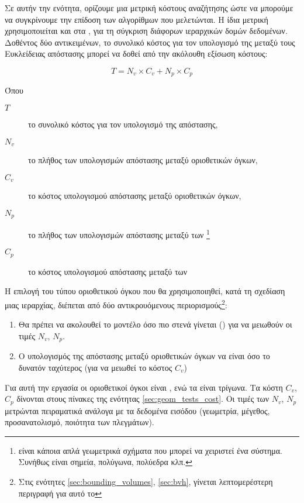 Σε αυτήν την ενότητα, ορίζουμε μια μετρική κόστους αναζήτησης
ώστε να μπορούμε να συγκρίνουμε την επίδοση των αλγορίθμων που μελετώνται.
Η ίδια μετρική χρησιμοποιείται και στα \cite{gottschalk1996obbtree},
\cite{larsen1999fast} για τη σύγκριση διάφορων ιεραρχικών δομών δεδομένων.
Δοθέντος δύο αντικειμένων, το συνολικό κόστος για τον υπολογισμό της μεταξύ τους 
Ευκλείδειας απόστασης μπορεί να δοθεί από την ακόλουθη εξίσωση κόστους:

\[ T = N_v \times C_v + N_p \times C_p \]

Όπου 
\begin{description}
    \item[$T$] το συνολικό κόστος για τον υπολογισμό της απόστασης,
    \item[$N_v$] το πλήθος των υπολογισμών απόστασης μεταξύ οριοθετικών όγκων,
    \item[$C_v$] το κόστος υπολογισμού απόστασης μεταξύ οριοθετικών όγκων,
    \item[$N_p$] το πλήθος των υπολογισμών απόστασης μεταξύ των 
    \footnote{ είναι κάποια απλά γεωμετρικά σχήματα 
    που μπορεί να χειριστεί ένα σύστημα. Συνήθως είναι σημεία, πολύγωνα, πολύεδρα κλπ.}
    \item[$C_p$] το κόστος υπολογισμού απόστασης μεταξύ των 
\end{description}

Η επιλογή του τύπου οριοθετικού όγκου που θα χρησιμοποιηθεί, κατά τη σχεδίαση μιας 
ιεραρχίας, διέπεται από δύο αντικρουόμενους περιορισμούς\footnote{
    Στις ενότητες \ref{sec:bounding_volumes}, \ref{sec:bvh}, γίνεται 
    λεπτομερέστερη περιγραφή για αυτό το  
}:
\begin{enumerate}
    \item Θα πρέπει να ακολουθεί το μοντέλο όσο πιο στενά γίνεται ()
    για να μειωθούν οι τιμές $N_v$, $N_p$.
    \item Ο υπολογισμός της απόστασης μεταξύ οριοθετικών όγκων να είναι όσο το 
    δυνατόν ταχύτερος (για να μειωθεί το κόστος $C_v$)
\end{enumerate}

Για αυτή την εργασία οι οριοθετικοί όγκοι είναι , ενώ τα  
είναι τρίγωνα.
Τα κόστη $C_v$, $C_p$ δίνονται στους πίνακες της ενότητας \ref{sec:geom_tests_cost}.
Οι τιμές των $N_v$, $N_p$ μετρώνται πειραματικά ανάλογα με τα δεδομένα εισόδου 
(γεωμετρία, μέγεθος, προσανατολισμό, ποιότητα των πλεγμάτων).


